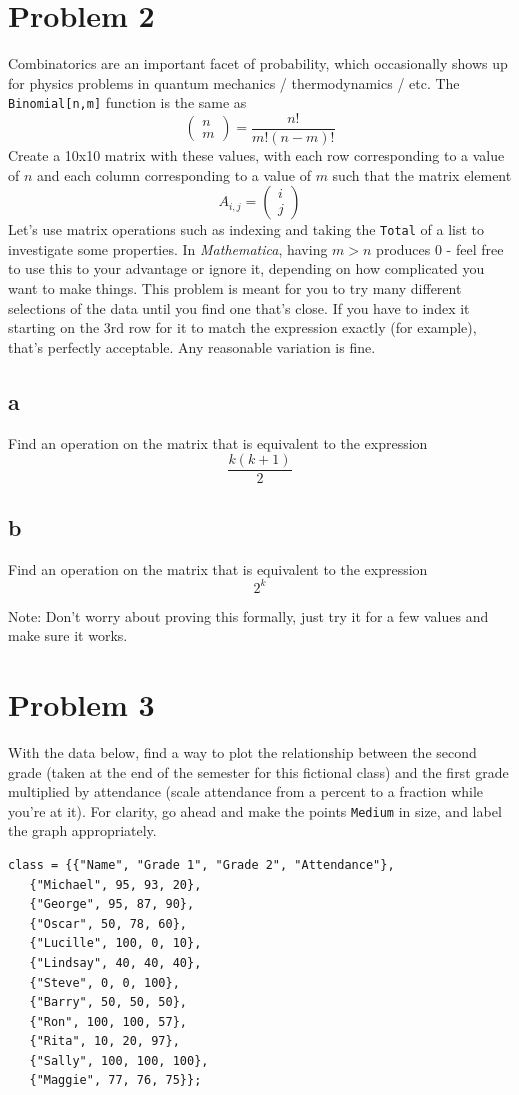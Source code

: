 \documentclass{article}
\begin{document}
\section{Problem 2}
Combinatorics are an important facet of probability, which occasionally shows up for physics problems in quantum mechanics / thermodynamics / etc. The \texttt{Binomial[n,m]} function
is the same as $$\left(\begin{array}{c}n\\m\end{array}\right)=\frac{n!}{m!(n-m)!}$$Create a 10x10 matrix with these values, with each row corresponding to a value of $n$ and each
column corresponding to a value of $m$ such that the matrix element $$A_{i,j}=\left(\begin{array}{c}i\\j\end{array}\right)$$ Let's use matrix operations such as indexing and taking the
\texttt{Total} of a list to investigate some properties. In \emph{Mathematica}, having $m>n$ produces 0 - feel free to use this to your advantage or ignore it, depending on how
complicated you want to make things. This problem is meant for you to try many different selections of the data until you find one that's close. If you have to index it
starting on the 3rd row for it to match the expression exactly (for example), that's perfectly acceptable. Any reasonable variation is fine.

\subsection{a}
Find an operation on the matrix that is equivalent to the expression $$\frac{k(k+1)}{2}$$

\subsection{b}
Find an operation on the matrix that is equivalent to the expression $$2^k$$

Note: Don't worry about proving this formally, just try it for a few values and make sure it works.

\section{Problem 3}
With the data below, find a way to plot the relationship between the second grade (taken at the end of the semester for this fictional class) and the first grade multiplied by attendance
(scale attendance from a percent to a fraction while you're at it). For clarity, go ahead and make the points \texttt{Medium} in size, and label the graph appropriately.

\begin{verbatim}
class = {{"Name", "Grade 1", "Grade 2", "Attendance"},
   {"Michael", 95, 93, 20},
   {"George", 95, 87, 90},
   {"Oscar", 50, 78, 60},
   {"Lucille", 100, 0, 10},
   {"Lindsay", 40, 40, 40},
   {"Steve", 0, 0, 100},
   {"Barry", 50, 50, 50},
   {"Ron", 100, 100, 57},
   {"Rita", 10, 20, 97},
   {"Sally", 100, 100, 100},
   {"Maggie", 77, 76, 75}};
\end{verbatim}
\end{document}
